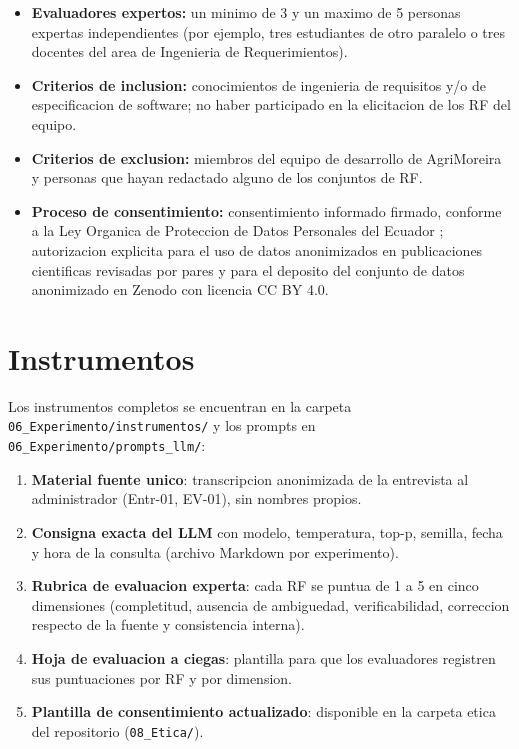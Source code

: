 \documentclass[12pt,a4paper]{article}
\begin{document}
\begin{itemize}
    \item \textbf{Evaluadores expertos:} un minimo de 3 y un maximo de 5
    personas expertas independientes (por ejemplo, tres estudiantes de otro
    paralelo o tres docentes del area de Ingenieria de Requerimientos).
    \item \textbf{Criterios de inclusion:} conocimientos de ingenieria de
    requisitos y/o de especificacion de software; no haber participado en la
    elicitacion de los RF del equipo.
    \item \textbf{Criterios de exclusion:} miembros del equipo de desarrollo de
    AgriMoreira y personas que hayan redactado alguno de los conjuntos de RF.
    \item \textbf{Proceso de consentimiento:} consentimiento informado firmado,
    conforme a la Ley Organica de Proteccion de Datos Personales del Ecuador
    \cite{lopdp2021}; autorizacion explicita para el uso de datos anonimizados
    en publicaciones cientificas revisadas por pares y para el deposito del
    conjunto de datos anonimizado en Zenodo con licencia CC BY 4.0.
\end{itemize}

\section{Instrumentos}

Los instrumentos completos se encuentran en la carpeta
\texttt{06\_Experimento/instrumentos/} y los prompts en
\texttt{06\_Experimento/prompts\_llm/}:

\begin{enumerate}
    \item \textbf{Material fuente unico}: transcripcion anonimizada de la
    entrevista al administrador (Entr-01, EV-01), sin nombres propios.
    \item \textbf{Consigna exacta del LLM} con modelo, temperatura, top-p,
    semilla, fecha y hora de la consulta (archivo Markdown por experimento).
    \item \textbf{Rubrica de evaluacion experta}: cada RF se puntua de 1 a 5 en
    cinco dimensiones (completitud, ausencia de ambiguedad, verificabilidad,
    correccion respecto de la fuente y consistencia interna).
    \item \textbf{Hoja de evaluacion a ciegas}: plantilla para que los
    evaluadores registren sus puntuaciones por RF y por dimension.
    \item \textbf{Plantilla de consentimiento actualizado}: disponible en la
    carpeta etica del repositorio (\texttt{08\_Etica/}).
\end{enumerate}
\end{document}
